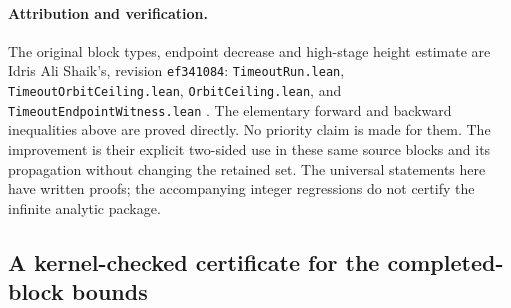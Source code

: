 \documentclass[11pt]{article}
\theoremstyle{remark}\newtheorem{remark}[proposition]{Remark}
\begin{document}
\paragraph{Attribution and verification.}
The original block types, endpoint decrease and high-stage height estimate
are Idris Ali Shaik's, revision \texttt{ef341084}:
\texttt{TimeoutRun.lean}, \texttt{TimeoutOrbitCeiling.lean},
\texttt{OrbitCeiling.lean}, and \texttt{TimeoutEndpointWitness.lean}
\cite{Shaik2026v324}. The elementary forward and backward inequalities
above are proved directly. No priority claim is made for them.
The improvement is their explicit two-sided use in these same source
blocks and its propagation without changing the retained set.
The universal statements here have written proofs; the accompanying
integer regressions do not certify the infinite analytic package.

\subsection{A kernel-checked certificate for the completed-block bounds}
\end{document}
